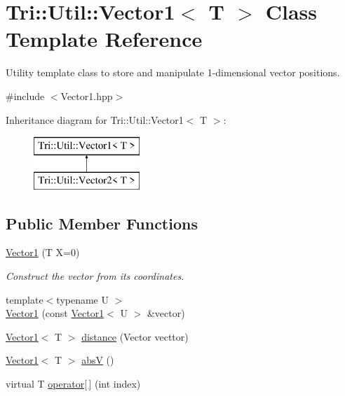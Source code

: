 \hypertarget{class_tri_1_1_util_1_1_vector1}{}\section{Tri\+:\+:Util\+:\+:Vector1$<$ T $>$ Class Template Reference}
\label{class_tri_1_1_util_1_1_vector1}


Utility template class to store and manipulate 1-\/dimensional vector positions.  




{\ttfamily \#include $<$Vector1.\+hpp$>$}

Inheritance diagram for Tri\+:\+:Util\+:\+:Vector1$<$ T $>$\+:\begin{figure}[H]
\begin{center}
\leavevmode
\includegraphics[height=2.000000cm]{class_tri_1_1_util_1_1_vector1}
\end{center}
\end{figure}
\subsection*{Public Member Functions}
\begin{DoxyCompactItemize}
\item 
\hyperlink{class_tri_1_1_util_1_1_vector1_a9cb0dd5b66dc93f09e8c63b89d021e78}{Vector1} (T X=0)
\begin{DoxyCompactList}\small\item\em Construct the vector from its coordinates. \end{DoxyCompactList}\item 
{\footnotesize template$<$typename U $>$ }\\\hyperlink{class_tri_1_1_util_1_1_vector1_a982472638e0a3a04f5580379f4e0ca41}{Vector1} (const \hyperlink{class_tri_1_1_util_1_1_vector1}{Vector1}$<$ U $>$ \&vector)
\item 
\hyperlink{class_tri_1_1_util_1_1_vector1}{Vector1}$<$ T $>$ \hyperlink{class_tri_1_1_util_1_1_vector1_ae59de9a7e666ef98c082fe84c435e377}{distance} (Vector vecttor)
\item 
\hyperlink{class_tri_1_1_util_1_1_vector1}{Vector1}$<$ T $>$ \hyperlink{class_tri_1_1_util_1_1_vector1_a9e9ec5a508989b4286aba7c09efb06f1}{abs\+V} ()
\item 
virtual T \hyperlink{class_tri_1_1_util_1_1_vector1_ad3fe27af88f400b0ffc651e7a9809c72}{operator\mbox{[}$\,$\mbox{]}} (int index)
\end{DoxyCompactItemize}
